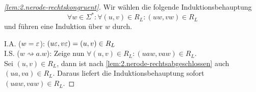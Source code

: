 \begin{proof}[\autoref{lem:2.nerode-rechtskongruent}]
     
     Wir wählen die folgende Induktionsbehauptung
     \begin{displaymath}
       \forall w\in\Sigma^*: \forall
       (u,v) \in R_L : (uw,vw)\in R_L
     \end{displaymath}
     und führen eine Induktion über $w$ durch.

     I.A.  ($w=\varepsilon$): $ (u\varepsilon,v\varepsilon)=(u,v)\in R_L$ \\
     I.S.  ($w\rightsquigarrow a.w$): Zeige nun $\forall
     (u,v) \in R_L : (uaw,vaw)\in R_L$.\\
     Sei $(u,v) \in R_L$, dann ist nach \autoref{lem:2.nerode-rechtsabgeschlossen} auch $(ua, va)  \in R_L$.
     Daraus liefert die Induktionsbehauptung sofort $(uaw, vaw)  \in R_L$.

\end{proof}

